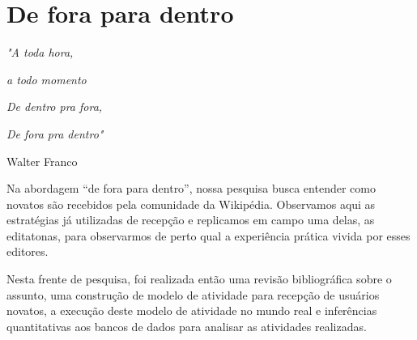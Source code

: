 \chapter{De fora para dentro}

\singlespacing
\begin{flushright}
\textit{"A toda hora,}

\textit{a todo momento}

\textit{De dentro pra fora,}

\textit{De fora pra dentro"}

Walter Franco
\end{flushright}
\doublespacing

Na abordagem ``de fora para dentro'', nossa pesquisa busca entender como novatos são recebidos pela comunidade da Wikipédia. Observamos aqui as estratégias já utilizadas de recepção e replicamos em campo uma delas, as editatonas, para observarmos de perto qual a experiência prática vivida por esses editores.

Nesta frente de pesquisa, foi realizada então uma revisão bibliográfica sobre o assunto, uma construção de modelo de atividade para recepção de usuários novatos, a execução deste modelo de atividade no mundo real e inferências quantitativas aos bancos de dados para analisar as atividades realizadas.





